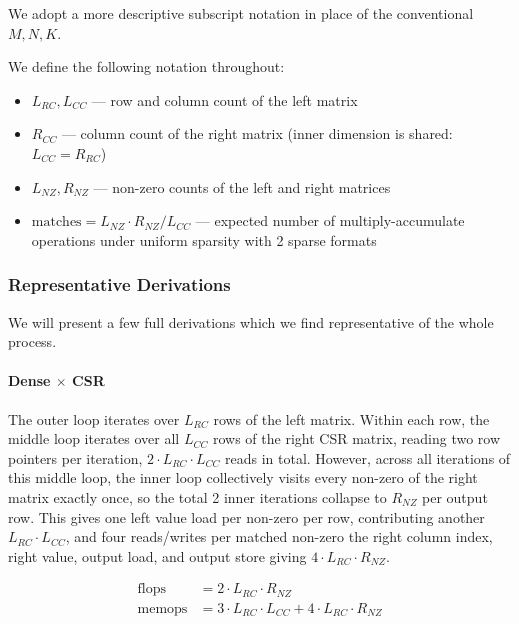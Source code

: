 \documentclass[sigconf]{acmart}
\begin{document}
We adopt a more descriptive subscript notation in place of the conventional $M, N, K$.

We define the following notation throughout:
\begin{itemize}
    \item $L_{RC}, L_{CC}$ --- row and column count of the left matrix
    \item $R_{CC}$ --- column count of the right matrix (inner dimension is shared: $L_{CC} = R_{RC}$)
    \item $L_{NZ}, R_{NZ}$ --- non-zero counts of the left and right matrices
    \item $\text{matches} = L_{NZ} \cdot R_{NZ} / L_{CC}$ --- expected number of multiply-accumulate operations under uniform sparsity with 2 sparse formats
\end{itemize}
\subsubsection*{Representative Derivations}
We will present a few full derivations which we find representative of the whole process.

\paragraph{Dense $\times$ CSR}
The outer loop iterates over $L_{RC}$ rows of the left matrix. Within each row, the middle
loop iterates over all $L_{CC}$ rows of the right CSR matrix, reading two row pointers per
iteration, $2 \cdot L_{RC} \cdot L_{CC}$ reads in total. However, across all iterations of
this middle loop, the inner loop collectively visits every non-zero of the right matrix exactly
once, so the total 2 inner iterations collapse to $R_{NZ}$ per output row. This gives one left
value load per non-zero per row, contributing another $L_{RC} \cdot L_{CC}$, and four reads/writes
per matched non-zero the right column index, right value, output load, and output store
giving $4 \cdot L_{RC} \cdot R_{NZ}$.

\begin{align}
\text{flops}  &= 2 \cdot L_{RC} \cdot R_{NZ} \\
\text{memops} &= 3 \cdot L_{RC} \cdot L_{CC} + 4 \cdot L_{RC} \cdot R_{NZ}
\end{align}
\end{document}
